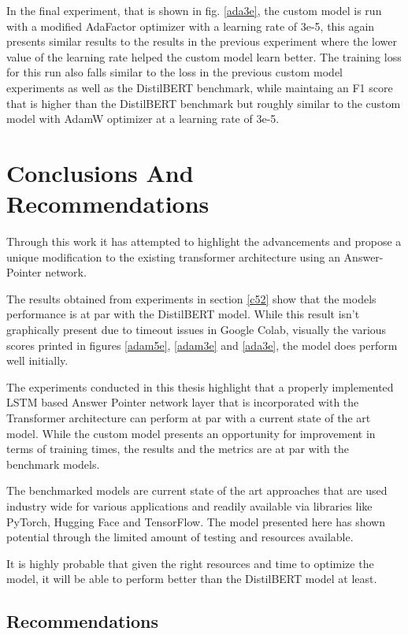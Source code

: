 \documentclass[a4paper,12pt]{report}
\begin{document}
	In the final experiment, that is shown in fig. \ref{ada3e}, the custom model is run with a modified AdaFactor optimizer with a learning rate of 3e-5, this again presents similar results to the results in the previous experiment where the lower value of the learning rate helped the custom model learn better. The training loss for this run also falls similar to the loss in the previous custom model experiments as well as the DistilBERT benchmark, while maintaing an F1 score that is higher than the DistilBERT benchmark but roughly similar to the custom model with AdamW optimizer at a learning rate of 3e-5.





    \chapter{Conclusions And Recommendations}\label{c6}

    Through this work it has attempted to highlight the advancements and propose a unique modification to the existing transformer architecture using an Answer-Pointer network.

    The results obtained from experiments in section \ref{c52} show that the models performance is at par with the DistilBERT model. While this result isn't graphically present due to timeout issues in Google Colab, visually the various scores printed in figures \ref{adam5e}, \ref{adam3e} and \ref{ada3e}, the model does perform well initially.

    The experiments conducted in this thesis highlight that a properly implemented LSTM based Answer Pointer network layer that is incorporated with the Transformer architecture can perform at par with a current state of the art model.
    While the custom model presents an opportunity for improvement in terms of training times, the results and the metrics are at par with the benchmark models.

    The benchmarked models are current state of the art approaches that are used industry wide for various applications and readily available via libraries like PyTorch, Hugging Face and TensorFlow. The model presented here has shown potential through the limited amount of testing and resources available.

    It is highly probable that given the right resources and time to optimize the model, it will be able to perform better than the DistilBERT model at least.

    \section{Recommendations}
\end{document}
